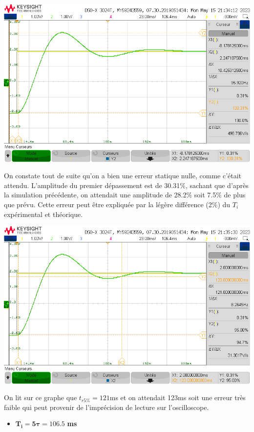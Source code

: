 \documentclass[12pt]{article}
\begin{document}
\begin{center}
    \includegraphics[width = 16 cm]{TP3/Syst_1/I/dep-syst1-ti=tau.png}
\end{center}
On constate tout de suite qu'on a bien une erreur statique nulle, comme c'était attendu. L'amplitude du premier dépassement est de 30.31$\%$, sachant que d'après la simulation précédente, on attendait une amplitude de 28.2$\%$ soit 7.5$\%$ de plus que prévu. Cette erreur peut être expliquée par la légère différence (2$\%$) du $T_i$ expérimental et théorique.
\begin{center}
    \includegraphics[width = 16 cm]{TP3/Syst_1/I/tr5prc-syst1-ti=tau1.png}
\end{center}
On lit sur ce graphe que $t_{r5\%} = 121$ms et on attendait 123ms soit une erreur très faible qui peut provenir de l'imprécision de lecture sur l'oscilloscope.
\begin{itemize}
    \item \large $\mathbf{T_i = 5\tau = 106.5}$ \bf ms
\end{itemize}
\end{document}
